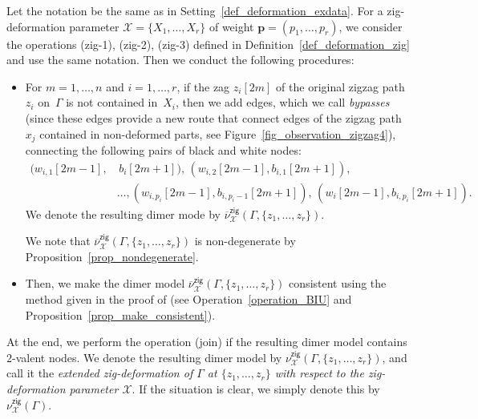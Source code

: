 \documentclass[pdftex]{sigma}%
\numberwithin{equation}{section}
\numberwithin{figure}{section}
\numberwithin{table}{section}
\newcommand{\calX}{\mathcal{X}}
\newcommand{\bfp}{\mathbf{p}}
\newcommand{\zig}{\mathsf{zig}}
\begin{document}
\begin{Definition}\label{def_exdeformation_zig}
Let the notation be the same as in Setting~\ref{def_deformation_exdata}.
For a zig-deformation parameter $\calX=\{X_1,\dots,X_r\}$ of weight $\bfp=(p_1,\dots,p_r)$, we consider
the operations (zig-1), (zig-2), (zig-3) defined in Definition~\ref{def_deformation_zig} and use the same notation.
Then we conduct the following procedures:
\begin{itemize}\itemsep=0pt
\setlength{\parskip}{0pt}
\setlength{\leftskip}{0.3cm}
\item[(\text{zig}-4)]
For $m=1,\dots,n$ and $i=1, \dots, r$, if the zag $z_i[2m]$ of the original zigzag path~$z_i$ on~$\Gamma$ is not contained in~$X_i$,
then we add edges, which we call \emph{bypasses}
(since these edges provide a new route that connect edges of the zigzag path $x_j$ contained in non-deformed parts, see Figure~\ref{fig_observation_zigzag4}),
connecting the following pairs of black and white nodes:
\begin{align*}
(w_{i,1}[2m-1], &\, b_i[2m+1]), \,(w_{i,2}[2m-1],b_{i,1}[2m+1]), \\ &\dots, (w_{i,p_i}[2m-1],b_{i,p_i-1}[2m+1]),\, (w_i[2m-1],b_{i,p_i}[2m+1]).
\end{align*}
We denote the resulting dimer mode by $\overline{\nu}^\zig_\calX(\Gamma, \{z_1,\dots,z_r\})$.

We note that $\overline{\nu}^\zig_\calX(\Gamma, \{z_1,\dots,z_r\})$ is non-degenerate by Proposition~\ref{prop_nondegenerate}.
\item[(\text{zig}-5)]
Then, we make the dimer model $\overline{\nu}^\zig_\calX(\Gamma, \{z_1,\dots,z_r\})$ consistent using the method given in the proof of \cite[Theorem~1.1]{BIU} (see Operation~\ref{operation_BIU} and Proposition~\ref{prop_make_consistent}).
\end{itemize}

At the end, we perform the operation (join) if the resulting dimer model contains $2$-valent nodes.
We denote the resulting dimer model by $\nu^\zig_\calX(\Gamma, \{z_1,\dots,z_r\})$,
and call it the \emph{extended zig-deformation of $\Gamma$ at $\{z_1,\dots,z_r\}$ with respect to the zig-deformation parameter $\calX$}.
If the situation is clear, we simply denote this by $\nu^\zig_\calX(\Gamma)$.
\end{Definition}
\end{document}
